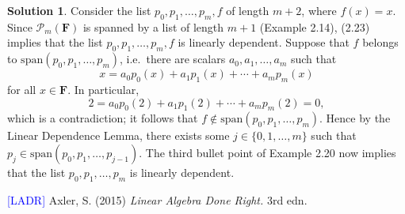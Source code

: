 \documentclass[12pt]{article}
\theoremstyle{definition}
\theoremstyle{exercise}
\theoremstyle{solution}
\newtheorem*{solution}{Solution}
\newcommand{\Span}{\text{span}}
\newcommand{\F}{\mathbf{F}}
\begin{document}
\begin{solution}
    Consider the list \( p_0, p_1, \ldots, p_m, f \) of length \( m + 2 \), where \( f(x) = x \). Since \( \mathcal{P}_m (\F) \) is spanned by a list of length \( m + 1 \) (Example 2.14), (2.23) implies that the list \( p_0, p_1, \ldots, p_m, f \) is linearly dependent. Suppose that \( f \) belongs to \( \Span (p_0, p_1, \ldots, p_m) \), i.e.\ there are scalars \( a_0, a_1, \ldots, a_m \) such that
    \[
        x = a_0 p_0(x) + a_1 p_1(x) + \cdots + a_m p_m(x)
    \]
    for all \( x \in \F \). In particular,
    \[
        2 = a_0 p_0(2) + a_1 p_1(2) + \cdots + a_m p_m(2) = 0,
    \]
    which is a contradiction; it follows that \( f \not\in \Span (p_0, p_1, \ldots, p_m) \). Hence by the Linear Dependence Lemma, there exists some \( j \in \{ 0, 1, \ldots, m \} \) such that \( p_j \in \Span (p_0, p_1, \ldots, p_{j-1}) \). The third bullet point of Example 2.20 now implies that the list \( p_0, p_1, \ldots, p_m \) is linearly dependent.
\end{solution}

\noindent \hrulefill

\noindent \hypertarget{ladr}{\textcolor{blue}{[LADR]} Axler, S. (2015) \textit{Linear Algebra Done Right.} 3rd edn.}
\end{document}
